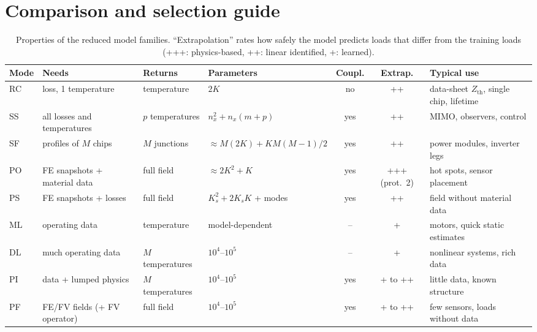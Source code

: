 \documentclass[11pt,a4paper]{article}
\newcommand{\Zth}{Z_{\mathrm{th}}}
\begin{document}
\section{Comparison and selection guide}\label{sec:select}
\begin{table}[h]\centering\footnotesize
\caption{Properties of the reduced model families. ``Extrapolation'' rates how safely the model predicts loads that
differ from the training loads (+++: physics-based, ++: linear identified, +: learned).}\label{tab:compare}
\setlength{\tabcolsep}{3.5pt}
\begin{tabularx}{\linewidth}{@{}l>{\raggedright\arraybackslash}X>{\raggedright\arraybackslash}p{1.9cm}>{\raggedright\arraybackslash}p{2.5cm}cc>{\raggedright\arraybackslash}X@{}}\toprule
Mode & Needs & Returns & Parameters & Coupl. & Extrap. & Typical use \\\midrule
RC & 1 loss, 1 temperature & 1 temperature & $2K$ & no & ++ & data-sheet $\Zth$, single chip, lifetime \\
SS & all losses and temperatures & $p$ temperatures & $n_x^2+n_x(m+p)$ & yes & ++ & MIMO, observers, control \\
SF & profiles of $M$ chips & $M$ junctions & $\approx M(2K)+KM(M-1)/2$ & yes & ++ & power modules, inverter legs \\
PO & FE snapshots + material data & full field & $\approx 2K^2+K$ & yes & +++ (prot.\ 2) & hot spots, sensor placement \\
PS & FE snapshots + losses & full field & $K_s^2+2K_sK$ + modes & yes & ++ & field without material data \\
ML & operating data & 1 temperature & model-dependent & -- & + & motors, quick static estimates \\
DL & much operating data & $M$ temperatures & $10^4$--$10^5$ & -- & + & nonlinear systems, rich data \\
PI & data + lumped physics & $M$ temperatures & $10^4$--$10^5$ & yes & + to ++ & little data, known structure \\
PF & FE/FV fields (+ FV operator) & full field & $10^4$--$10^5$ & yes & + to ++ & few sensors, loads without data \\\bottomrule
\end{tabularx}
\end{table}
\end{document}

